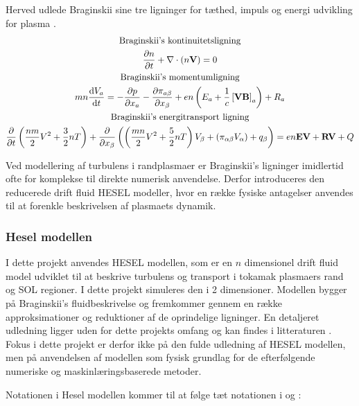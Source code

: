 Herved udlede Braginskii sine tre ligninger for tæthed, impuls og energi udvikling for plasma \cite{braginskii1965}. 
\begin{gather}
    \text{Braginskii's kontinuitetsligning}\notag \\
    \frac{\partial n}{\partial t} + \nabla \cdot (n \mathbf{V}) = 0 \label{eq:Braginskii's kontinuitetsligning}\\
    \text{Braginskii's momentumligning}\notag \\
    mn\frac{\mathrm{d}V_a}{\mathrm{d}t} = - \frac{\partial p}{\partial x_a} - \frac{\partial \pi_{a\beta}}{\partial x_\beta}
    + en\left(E_a + \frac{1}{c} \left[\mathbf{VB}\right]_a\right) + R_a \label{eq:Braginskii's momentum ligning}\\
    \text{Braginskii's energitransport ligning}\notag \\
    \frac{\partial}{\partial t}\left(\frac{nm}{2}  V^2 + \frac{3}{2} n T\right) +
    \frac{\partial}{\partial x_\beta} \left( \left(\frac{mn}{2}V^2  +\frac{5}{2} nT\right)V_\beta +
    \left(\pi_{\alpha \beta} V_\alpha \right) + q_\beta \right) = en\mathbf{EV} + \mathbf{RV} + Q \label{eq:Braginskii's energitransport ligning}
\end{gather}

Ved modellering af turbulens i randplasmaer er Braginskii's ligninger imidlertid ofte for komplekse til direkte numerisk anvendelse.
Derfor introduceres den reducerede drift fluid HESEL modeller, hvor en række fysiske antagelser anvendes til at forenkle beskrivelsen af plasmaets dynamik.

\subsubsection{Hesel modellen}
I dette projekt anvendes HESEL modellen, som er en $n$ dimensionel drift fluid model udviklet til at beskrive turbulens
og transport i tokamak plasmaers rand og SOL regioner. I dette projekt simuleres den i 2 dimensioner.
Modellen bygger på Braginskii's fluidbeskrivelse og fremkommer gennem en række approksimationer og reduktioner af de oprindelige ligninger.
En detaljeret udledning ligger uden for dette projekts omfang og kan findes i litteraturen \cite{udledning_af_hesel}.
Fokus i dette projekt er derfor ikke på den fulde udledning af HESEL modellen, men på anvendelsen af modellen
som fysisk grundlag for de efterfølgende numeriske og maskinlæringsbaserede metoder.

Notationen i Hesel modellen kommer til at følge tæt notationen i \cite{num_sim_blobs} og \cite{plasma_particle_sources}:

